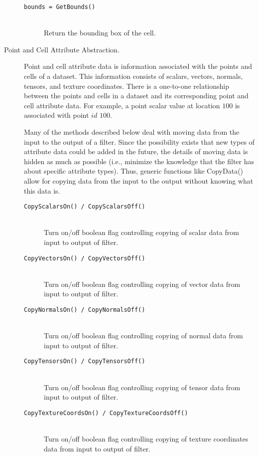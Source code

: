 \begin{description}
\begin{description}
    \item[\texttt{bounds = GetBounds()}] \hfill \\
    Return the bounding box of the cell.

    \end{description}

\item[Point and Cell Attribute Abstraction.] Point and cell attribute data is information associated with the points and cells of a dataset. This information consists of scalars, vectors, normals, tensors, and texture coordinates. There is a one-to-one relationship between the points and cells in a dataset and its corresponding point and cell attribute data. For example, a point scalar value at location $100$ is associated with point $id$ $100$.

Many of the methods described below deal with moving data from the input to the output of a filter. Since the possibility exists that new types of attribute data could be added in the future, the details of moving data is hidden as much as possible (i.e., minimize the knowledge that the filter has about specific attribute types). Thus, generic functions like CopyData() allow for copying data from the input to the output without knowing what this data is.
    \begin{description}

    \item[\texttt{CopyScalarsOn() / CopyScalarsOff()}] \hfill \\
    Turn on/off boolean flag controlling copying of scalar data from input to output of filter.

    \item[\texttt{CopyVectorsOn() / CopyVectorsOff()}] \hfill \\
    Turn on/off boolean flag controlling copying of vector data from input to output of filter.

    \item[\texttt{CopyNormalsOn() / CopyNormalsOff()}] \hfill \\
    Turn on/off boolean flag controlling copying of normal data from input to output of filter.

    \item[\texttt{CopyTensorsOn() / CopyTensorsOff()}] \hfill \\
    Turn on/off boolean flag controlling copying of tensor data from input to output of filter.

    \item[\texttt{CopyTextureCoordsOn() / CopyTextureCoordsOff()}] \hfill \\
    Turn on/off boolean flag controlling copying of texture coordinates data from input to output of filter.


\end{description}
\end{description}

